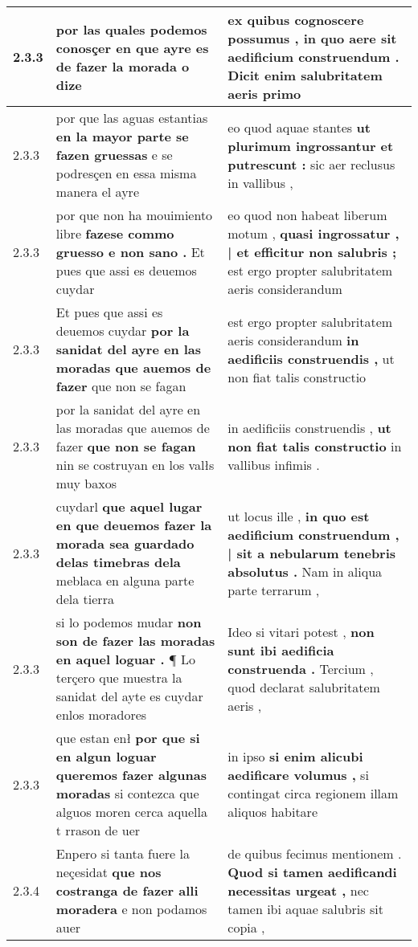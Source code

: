 \begin{tabular}{|p{1cm}|p{6.5cm}|p{6.5cm}|}
2.3.3 & por las quales podemos conosçer \textbf{ en que ayre es de fazer la morada } o dize & ex quibus cognoscere possumus , \textbf{ in quo aere sit aedificium construendum . } Dicit enim salubritatem aeris primo \\\hline
2.3.3 & por que las aguas estantias \textbf{ en la mayor parte se fazen gruessas } e se podresçen en essa misma manera el ayre & eo quod aquae stantes \textbf{ ut plurimum ingrossantur et putrescunt : } sic aer reclusus in vallibus , \\\hline
2.3.3 & por que non ha mouimiento libre \textbf{ fazese commo gruesso e non sano . } Et pues que assi es deuemos cuydar & eo quod non habeat liberum motum , \textbf{ quasi ingrossatur , | et efficitur non salubris ; } est ergo propter salubritatem aeris considerandum \\\hline
2.3.3 & Et pues que assi es deuemos cuydar \textbf{ por la sanidat del ayre en las moradas que auemos de fazer } que non se fagan & est ergo propter salubritatem aeris considerandum \textbf{ in aedificiis construendis , } ut non fiat talis constructio \\\hline
2.3.3 & por la sanidat del ayre en las moradas que auemos de fazer \textbf{ que non se fagan } nin se costruyan en los valłs muy baxos & in aedificiis construendis , \textbf{ ut non fiat talis constructio } in vallibus infimis . \\\hline
2.3.3 & cuydarl \textbf{ que aquel lugar en que deuemos fazer la morada sea guardado delas timebras dela } meblaca en alguna parte dela tierra & ut locus ille , \textbf{ in quo est aedificium construendum , | sit a nebularum tenebris absolutus . } Nam in aliqua parte terrarum , \\\hline
2.3.3 & si lo podemos mudar \textbf{ non son de fazer las moradas en aquel loguar . } ¶ Lo terçero que muestra la sanidat del ayte es cuydar enlos moradores & Ideo si vitari potest , \textbf{ non sunt ibi aedificia construenda . } Tercium , quod declarat salubritatem aeris , \\\hline
2.3.3 & que estan enł \textbf{ por que si en algun loguar queremos fazer algunas moradas } si contezca que alguos moren cerca aquella t rrason de uer & in ipso \textbf{ si enim alicubi aedificare volumus , } si contingat circa regionem illam aliquos habitare \\\hline
2.3.4 & Enpero si tanta fuere la neçesidat \textbf{ que nos costranga de fazer alli moradera } e non podamos auer & de quibus fecimus mentionem . \textbf{ Quod si tamen aedificandi necessitas urgeat , } nec tamen ibi aquae salubris sit copia , \\\hline

\end{tabular}
